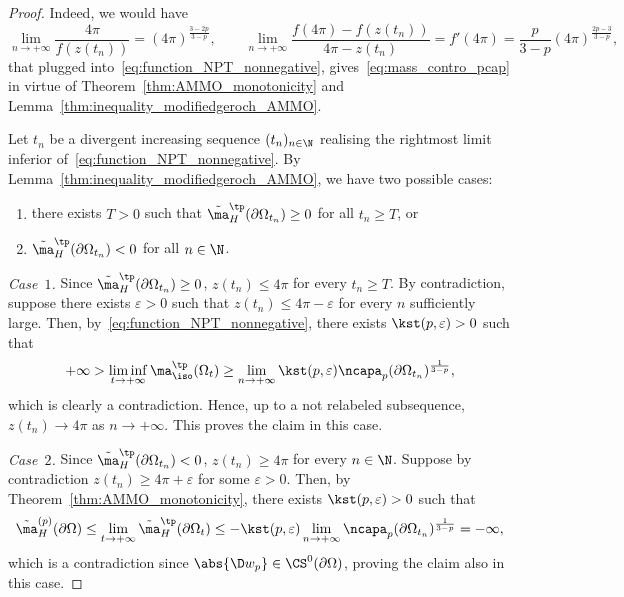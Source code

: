 \begin{proof}
Indeed, we would have
\[
 \lim_{n \to +\infty} \frac{4\pi}{f(z(t_n))} =(4 \pi )^{\frac{3-2p}{3-p}},\qquad \lim_{n\to +\infty}\frac{f(4 \pi )-f(z(t_n))}{4\pi-z(t_n)} = f'(4 \pi ) = \frac{p}{3-p} (4\pi)^{\frac{2p-3}{3-p}},
\]
that plugged into~\eqref{eq:function_NPT_nonnegative}, gives~\eqref{eq:mass_contro_pcap} in virtue of Theorem~\ref{thm:AMMO_monotonicity} and Lemma~\ref{thm:inequality_modifiedgeroch_AMMO}.

Let $t_n$ be a divergent increasing sequence $(t_n)_{n \in \N}$ realising the rightmost limit inferior of~\eqref{eq:function_NPT_nonnegative}. By Lemma~\ref{thm:inequality_modifiedgeroch_AMMO}, we have two possible cases:
\begin{enumerate}\itemsep=0pt
 \item[(1)] there exists $T>0$ such that $\tilde{\ma}^{\tp}_{H}(\partial \Omega_{t_n})\geq 0$ for all $t_n \geq T$, or
 \item[(2)] $\tilde{\ma}^{\tp}_{H}(\partial \Omega_{t_n})< 0$ for all $n\in \N$.
\end{enumerate}

\emph{Case~$1$.} Since $\tilde{\ma}^{\tp}_H(\partial \Omega_{t_n}) \geq 0 $, $z(t_n)\leq 4 \pi $ for every $t_n \geq T$. By contradiction, suppose there exists $\varepsilon>0$ such that $z(t_n) \leq 4 \pi - \varepsilon$ for every $n$ sufficiently large. Then, by~\eqref{eq:function_NPT_nonnegative}, there exists $\kst(p,\varepsilon)>0$ such that
\[
 +\infty>\liminf_{t\to +\infty} \ma^{\tp}_{\iso}(\Omega_{t}) \geq \lim_{n \to +\infty} \kst(p,\varepsilon)\ncapa_{p}(\partial \Omega_{t_n})^{\frac{1}{3-p}},
\]
which is clearly a contradiction. Hence, up to a not relabeled subsequence, $z(t_n) \to 4\pi$ as $n \to +\infty$. This proves the claim in this case.

\emph{Case~$2$.} %
Since $\tilde{\ma}^{\tp}_{H}(\partial \Omega_{t_n}) <0 $, $z(t_n) \geq 4 \pi$ for every $n\in \N$. Suppose by contradiction $z(t_n) \geq 4 \pi + \varepsilon$ for some $\varepsilon>0$. Then, by Theorem~\ref{thm:AMMO_monotonicity}, there exists $\kst(p,\varepsilon)>0$ such that
\[
 \tilde{\ma}^{(p)}_{H}(\partial \Omega) \leq \lim_{t \to +\infty} \tilde{\ma}^{\tp}_{H}(\partial \Omega_t) \leq -\kst(p,\varepsilon)\lim_{n \to +\infty}\ncapa_{p}(\partial \Omega_{t_n})^{\frac{1}{3-p}}=-\infty,
\]
which is a contradiction since $\abs{\D w_p} \in \CS^0(\partial \Omega)$, proving the claim also in this case.\end{proof}
